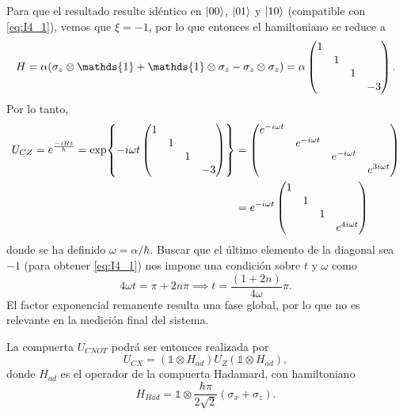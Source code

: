 \documentclass{scrartcl}
\DeclareRobustCommand{\[}{\begin{equation}}
\DeclareRobustCommand{\]}{\end{equation}}
\begin{document}
\begin{enumerate}
\[    \]
    Para que el resultado resulte idéntico en $\ket{00}$, $\ket{01}$ y $\ket{10}$ (compatible con \eqref{eq:I4_1}), vemos que $\xi = -1$, por lo que entonces el hamiltoniano se reduce a
    \[ H = \alpha (\sigma_z \otimes \mathds{1} + \mathds{1} \otimes \sigma_z - \sigma_z \otimes \sigma_z ) = \alpha \begin{pmatrix} \mqty{\dmat{1, 1, 1, -3}} \end{pmatrix}. \]
    Por lo tanto,
    \begin{align}
        U_{CZ} = e^{\frac{-iHt}{\hbar}} = \exp{-i\omega t \begin{pmatrix} \mqty{\dmat{1, 1, 1, -3}} \end{pmatrix}} &=
        \begin{pmatrix}
            \mqty{\dmat{e^{-i\omega t}, e^{-i\omega t}, e^{-i\omega t}, e^{3i\omega t}}}
        \end{pmatrix} \\
        &= e^{-i\omega t}
        \begin{pmatrix}
            \mqty{\dmat{1, 1, 1, e^{4i\omega t}}}
        \end{pmatrix}
    \end{align}
    donde se ha definido $\omega = \alpha / \hbar$. Buscar que el último elemento de la diagonal sea $-1$ (para obtener \eqref{eq:I4_1}) nos impone una condición sobre $t$ y $\omega$ como
    \[ 4\omega t = \pi + 2n\pi \implies t = \frac{(1+2n)}{4\omega} \pi. \]
    El factor exponencial remanente resulta una fase global, por lo que no es relevante en la medición final del sistema.
    
    La compuerta $U_{CNOT}$ podrá ser entonces realizada por
    \[ U_{CX} = (\mathds{1} \otimes H_{ad} ) U_Z (\mathds{1} \otimes H_{ad}), \]
    donde $H_{ad}$ es el operador de la compuerta Hadamard, con hamiltoniano 
    \[ H_{Had} = \mathds{1} \otimes \frac{\hbar \pi}{2 \sqrt{2}} (\sigma_x + \sigma_z). \]
    
\end{enumerate}
\end{document}
